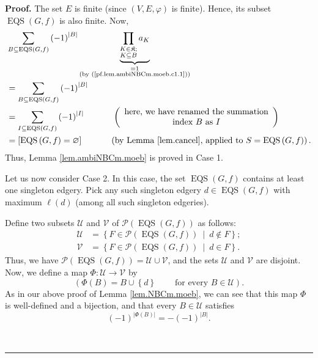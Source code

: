 \documentclass[numbers=enddot,12pt,final,onecolumn,notitlepage]{scrartcl}%
\theoremstyle{definition}
\newenvironment{proof}[1][Proof]{\noindent\textbf{#1.} }{\ \rule{0.5em}{0.5em}}
\newenvironment{verlong}{}{}
\newenvironment{vershort}{}{}
\let\sumnonlimits\sum
\let\prodnonlimits\prod
\renewcommand{\sum}{\sumnonlimits\limits}
\renewcommand{\prod}{\prodnonlimits\limits}
\begin{document}
\begin{proof}
\begin{verlong}
The set $E$ is finite (since $\left(  V,E,\varphi\right)  $ is finite). Hence,
its subset $\operatorname*{EQS}\left(  G,f\right)  $ is also finite. Now,
\begin{align*}
&  \sum_{B\subseteq\operatorname*{EQS}\left(  G,f\right)  }\left(  -1\right)
^{\left\vert B\right\vert }\underbrace{\prod_{\substack{K\in\mathfrak{K}%
;\\K\subseteq B}}a_{K}}_{\substack{=1\\\text{(by
(\ref{pf.lem.ambiNBCm.moeb.c1.1}))}}}\\
&  =\sum_{B\subseteq\operatorname*{EQS}\left(  G,f\right)  }\left(  -1\right)
^{\left\vert B\right\vert }\\
&  =\sum_{I\subseteq\operatorname*{EQS}\left(  G,f\right)  }\left(  -1\right)
^{\left\vert I\right\vert }\ \ \ \ \ \ \ \ \ \ \left(
\begin{array}
[c]{c}%
\text{here, we have renamed the summation}\\
\text{index }B\text{ as }I
\end{array}
\right) \\
&  =\left[  \operatorname*{EQS}\left(  G,f\right)  =\varnothing\right]
\ \ \ \ \ \ \ \ \ \ \left(  \text{by Lemma \ref{lem.cancel}, applied to
}S=\operatorname*{EQS}\left(  G,f\right)  \right)  .
\end{align*}
Thus, Lemma \ref{lem.ambiNBCm.moeb} is proved in Case 1.
\end{verlong}

\begin{vershort}
Let us now consider Case 2. In this case, the set $\operatorname*{EQS}\left(
G,f\right)  $ contains at least one singleton edgery. Pick any such singleton
edgery $d\in\operatorname*{EQS}\left(  G,f\right)  $ with maximum $\ell\left(
d\right)  $ (among all such singleton edgeries).

Define two subsets $\mathcal{U}$ and $\mathcal{V}$ of $\mathcal{P}\left(
\operatorname*{EQS}\left(  G,f\right)  \right)  $ as follows:%
\begin{align*}
\mathcal{U}  &  =\left\{  F\in\mathcal{P}\left(  \operatorname*{EQS}\left(
G,f\right)  \right)  \ \mid\ d\notin F\right\}  ;\\
\mathcal{V}  &  =\left\{  F\in\mathcal{P}\left(  \operatorname*{EQS}\left(
G,f\right)  \right)  \ \mid\ d\in F\right\}  .
\end{align*}
Thus, we have $\mathcal{P}\left(  \operatorname*{EQS}\left(  G,f\right)
\right)  =\mathcal{U}\cup\mathcal{V}$, and the sets $\mathcal{U}$ and
$\mathcal{V}$ are disjoint. Now, we define a map $\Phi:\mathcal{U}%
\rightarrow\mathcal{V}$ by%
\[
\left(  \Phi\left(  B\right)  =B\cup\left\{  d\right\}
\ \ \ \ \ \ \ \ \ \ \text{for every }B\in\mathcal{U}\right)  .
\]
As in our above proof of Lemma \ref{lem.NBCm.moeb}, we can see that this map
$\Phi$ is well-defined and a bijection, and that every $B\in\mathcal{U}$
satisfies%
\begin{equation}
\left(  -1\right)  ^{\left\vert \Phi\left(  B\right)  \right\vert }=-\left(
-1\right)  ^{\left\vert B\right\vert }.
\label{pf.lem.ambiNBCm.moeb.short.Phi.-1}%
\end{equation}



\end{vershort}
\end{proof}
\end{document}
